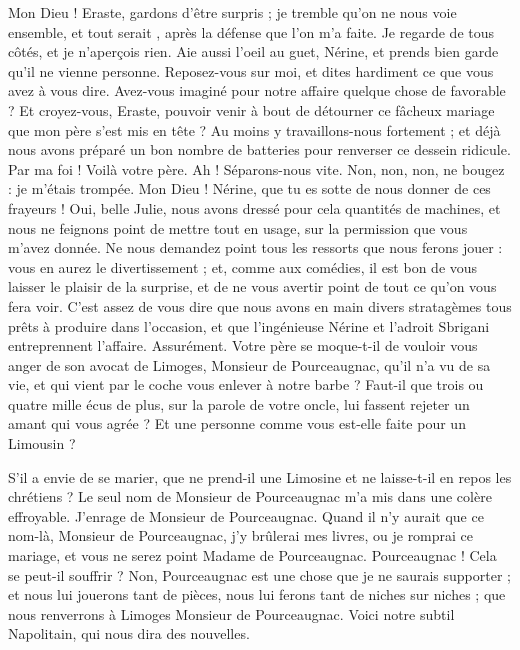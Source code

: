 \documentclass[12pt]{article}
\begin{document}
\begin{ekddrama}
\begin{speech}
Mon Dieu ! Eraste, gardons d'être surpris ; je tremble
qu'on ne nous voie ensemble, et tout serait , après la
défense que l'on m'a faite.
Je regarde de tous côtés, et je n'aperçois rien.
Aie aussi l'oeil au guet, Nérine, et prends bien garde qu'il
ne vienne personne.
Reposez-vous sur moi, et dites hardiment ce que vous
avez à vous dire.
Avez-vous imaginé pour notre affaire quelque chose de
favorable ? Et croyez-vous, Eraste, pouvoir venir à bout
de détourner ce fâcheux mariage que mon père s'est mis
en tête ?
Au moins y travaillons-nous fortement ; et déjà nous
avons préparé un bon nombre de batteries pour renverser
ce dessein ridicule.
Par ma foi ! Voilà votre père.
Ah ! Séparons-nous vite.
Non, non, non, ne bougez : je m'étais trompée.
Mon Dieu ! Nérine, que tu es sotte de nous donner de ces
frayeurs !
Oui, belle Julie, nous avons dressé pour cela quantités de
machines, et nous ne feignons point de mettre tout en
usage, sur la permission que vous m'avez donnée. Ne
nous demandez point tous les ressorts que nous ferons
jouer : vous en aurez le divertissement ; et, comme aux
comédies, il est bon de vous laisser le plaisir de la
surprise, et de ne vous avertir point de tout ce qu'on vous
fera voir. C'est assez de vous dire que nous avons en
main divers stratagèmes tous prêts à produire dans
l'occasion, et que l'ingénieuse Nérine et l'adroit Sbrigani
entreprennent l'affaire.
Assurément. Votre père se moque-t-il de vouloir vous
anger de son avocat de Limoges, Monsieur de
Pourceaugnac, qu'il n'a vu de sa vie, et qui vient par le
coche vous enlever à notre barbe ? Faut-il que trois ou
quatre mille écus de plus, sur la parole de votre oncle, lui
fassent rejeter un amant qui vous agrée ? Et une personne
comme vous est-elle faite pour un Limousin ? 

S'il a envie de se marier, que ne prend-il une Limosine et ne
laisse-t-il en repos les chrétiens ? Le seul nom de
Monsieur de Pourceaugnac m'a mis dans une colère
effroyable. J'enrage de Monsieur de Pourceaugnac.
Quand il n'y aurait que ce nom-là, Monsieur de
Pourceaugnac, j'y brûlerai mes livres, ou je romprai ce
mariage, et vous ne serez point Madame de
Pourceaugnac. Pourceaugnac ! Cela se peut-il souffrir ?
Non, Pourceaugnac est une chose que je ne saurais
supporter ; et nous lui jouerons tant de pièces, nous lui
ferons tant de niches sur niches ; que nous renverrons à
Limoges Monsieur de Pourceaugnac.
Voici notre subtil Napolitain, qui nous dira des nouvelles.
\end{speech}

\end{ekddrama}
\end{document}
